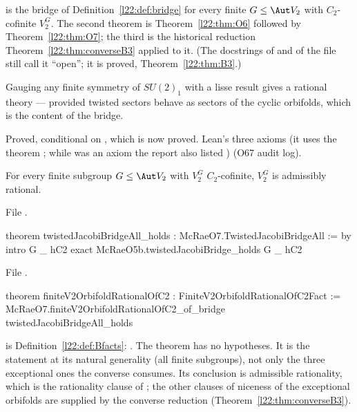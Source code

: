 \begin{dictionary}
 is the bridge of Definition~\ref{l22:def:bridge} for every finite $G\le\Aut V_2$ with
$C_2$-cofinite $V_2^G$. The second theorem is Theorem~\ref{l22:thm:O6} followed by Theorem~\ref{l22:thm:O7}; the third
is the historical reduction Theorem~\ref{l22:thm:converseB3} applied to it. (The docstrings of
 and of the file still call it ``open''; it is proved, Theorem~\ref{l22:thm:B3}.)
\end{dictionary}

\begin{physics}
Gauging any finite symmetry of $SU(2)_1$ with a lisse result gives a rational theory --- provided twisted sectors behave
as sectors of the cyclic orbifolds, which is the content of the bridge.
\end{physics}

\begin{status}
Proved, conditional on , which is now proved. Lean's three axioms (it uses the theorem ; while  was an axiom the report also listed ) (O67 audit log).
\end{status}

\begin{theorem}\label{l22:thm:B3}
For every finite subgroup $G\le\Aut V_2$ with $V_2^G$ $C_2$-cofinite, $V_2^G$ is admissibly rational.
\end{theorem}
\noindent File .
\begin{leancode}
theorem twistedJacobiBridgeAll_holds : McRaeO7.TwistedJacobiBridgeAll := by
  intro G _ hC2
  exact McRaeO5b.twistedJacobiBridge_holds G _ hC2
\end{leancode}
\noindent File .
\begin{leancode}
theorem finiteV2OrbifoldRationalOfC2 : FiniteV2OrbifoldRationalOfC2Fact :=
  McRaeO7.finiteV2OrbifoldRationalOfC2_of_bridge twistedJacobiBridgeAll_holds
\end{leancode}

\begin{dictionary}
 is Definition~\ref{l22:def:Bfacts}: . The theorem has no hypotheses. It is the
statement at its natural generality (all finite subgroups), not only the three exceptional ones the converse consumes.
Its conclusion is admissible rationality, which is the rationality clause of ; the other clauses of
niceness of the exceptional orbifolds are supplied by the converse reduction (Theorem~\ref{l22:thm:converseB3}).
\end{dictionary}

